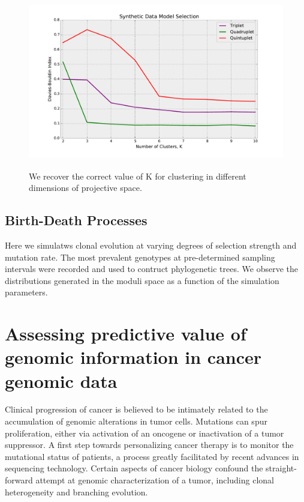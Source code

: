 \documentclass[a4paper,11pt]{article}
\begin{document}
\begin{figure}[t!]
    \centering
    \includegraphics[height=3in]{../figures/synthetic_davies_bouldin.pdf}
    \caption{We recover the correct value of K for clustering in different dimensions of projective space.}
    \label{fig:davies_bouldin}
\end{figure}

\subsection{Birth-Death Processes}

Here we simulatws clonal evolution at varying degrees of selection strength and mutation rate.
The most prevalent genotypes at pre-determined sampling intervals were recorded and used to contruct phylogenetic trees.
We observe the distributions generated in the moduli space as a function of the simulation parameters.


\section{Assessing predictive value of genomic information in cancer genomic data}\label{sec:cancer}

Clinical progression of cancer is believed to be intimately related to the accumulation of genomic alterations in tumor cells.
Mutations can spur proliferation, either via activation of an oncogene or inactivation of a tumor suppressor.
A first step towards personalizing cancer therapy is to monitor the mutational status of patients, a process greatly facilitated by recent advances in sequencing technology.
Certain aspects of cancer biology confound the straight-forward attempt at genomic characterization of a tumor, including clonal heterogeneity and branching evolution.
\end{document}
